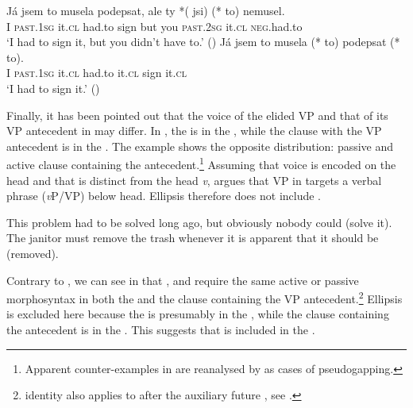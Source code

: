\documentclass[output=paper,colorlinks,citecolor=brown,]{langsci/langscibook}
\begin{document}
\begin{exe}
\ex \label{28}
\begin{xlist}
\ex \label{28a} \gll Já jsem to musela podepsat, ale ty *(\hspace{-2pt} jsi) (*\hspace{-2pt} to) nemusel.\\
I \textsc{past}.\textsc{1sg} it.\textsc{cl} had.to sign but you {} \textsc{past}.\textsc{2sg} {} it.\textsc{cl} \textsc{neg}.had.to\\
\glt `I had to sign it, but you didn't have to.' \hfill ()
\ex \label{28b} \gll Já jsem to musela  (*\hspace{-2pt} to)   podepsat (*\hspace{-2pt} to).\\
I \textsc{past}.\textsc{1sg} it.\textsc{cl} had.to  {} it.\textsc{cl}  sign  {} it.\textsc{cl} \\
\glt `I had to sign it.' \hfill ()
\end{xlist}
\end{exe}


\noindent Finally, it has been pointed out \citep{Hardt1993,Merchant2008a,Merchant2013} that the voice of the elided VP and that of its VP antecedent in  may differ. In , the  is in the , while the clause with the VP antecedent is in the . The example  shows the opposite distribution: passive  and active clause containing the antecedent.\footnote{Apparent counter-examples in  are reanalysed by \cite{Merchant2013} as cases of pseudogapping.} Assuming that voice is encoded on the head  and that  is distinct from the head \textit{v}, \cite{Merchant2008a} argues that VP  in  targets a verbal phrase (\textit{v}P/VP) below  head. Ellipsis therefore does not include .

\begin{exe}
\ex \label{29}
\begin{xlist}
\ex \label{29a}This problem had to be solved long ago, but obviously nobody could (solve it). \hfill \citep{Merchant2008a}
\ex \label{29b}The janitor must remove the trash whenever it is apparent that it should be (removed). \hfill \citep{Merchant2008a}
\end{xlist}
\end{exe}


\noindent Contrary to , we can see in  that ,  and  require the same active or passive morphosyntax in both the  and the clause containing the VP antecedent.\footnote{ identity also applies to  after the auxiliary future , see .} Ellipsis is excluded here because the  is presumably in the , while the clause containing the antecedent is in the . This suggests that  is included in the .
\end{document}
